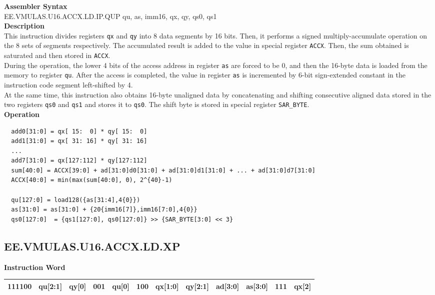 \textbf{Assembler Syntax} \\
EE.VMULAS.U16.ACCX.LD.IP.QUP qu, as, imm16, qx, qy, qs0, qs1 \\
\textbf{Description} \\
This instruction divides registers \lstinline{qx} and \lstinline{qy} into 8 data segments by 16 bits. Then, it performs a signed multiply-accumulate operation on the 8 sets of segments respectively. The accumulated result is added to the value in special register \lstinline{ACCX}. Then, the sum obtained is saturated and then stored in \lstinline{ACCX}.\\
During the operation, the lower 4 bits of the access address in register \lstinline{as} are forced to be 0, and then the 16-byte data is loaded from the memory to register \lstinline{qu}. After the access is completed, the value in register \lstinline{as} is incremented by 6-bit sign-extended constant in the instruction code segment left-shifted by 4.\\
At the same time, this instruction also obtains 16-byte unaligned data by concatenating and shifting consecutive aligned data stored in the two registers \lstinline{qs0} and \lstinline{qs1} and stores it to \lstinline{qs0}. The shift byte is stored in special register \lstinline{SAR_BYTE}.\\
\textbf{Operation}
\begin{lstlisting}
  add0[31:0] = qx[ 15:  0] * qy[ 15:  0]
  add1[31:0] = qx[ 31: 16] * qy[ 31: 16]
  ...
  add7[31:0] = qx[127:112] * qy[127:112]
  sum[40:0] = ACCX[39:0] + ad[31:0]d0[31:0] + ad[31:0]d1[31:0] + ... + ad[31:0]d7[31:0]
  ACCX[40:0] = min(max(sum[40:0], 0), 2^{40}-1)

  qu[127:0] = load128({as[31:4],4{0}})
  as[31:0] = as[31:0] + {20{imm16[7]},imm16[7:0],4{0}}
  qs0[127:0]  = {qs1[127:0], qs0[127:0]} >> {SAR_BYTE[3:0] << 3}
\end{lstlisting}

\clearpage
\subsection{EE.VMULAS.U16.ACCX.LD.XP}\label{instruction:EEVMULASU16ACCXLDXP}
\setlength\tabcolsep{6pt}
\textbf{Instruction Word} \\
\begin{tabular}{|c|c|c|c|c|c|c|c|c|c|c|c|}
	\hline
	111100 & qu[2:1] & qy[0] & 001 & qu[0] & 100 & qx[1:0] & qy[2:1] & ad[3:0] & as[3:0] & 111 & qx[2] \\
	\hline
\end{tabular}

